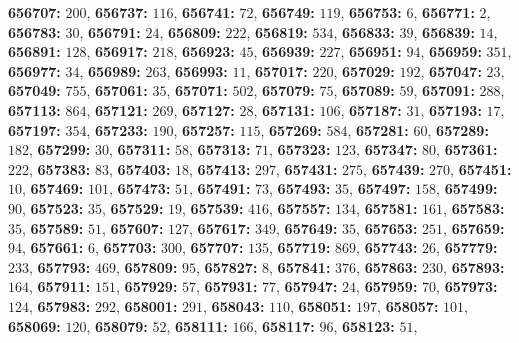 \textsf{\bfseries 656707:} $200$, \textsf{\bfseries 656737:} $116$, \textsf{\bfseries 656741:} $72$, \textsf{\bfseries 656749:} $119$, \textsf{\bfseries 656753:} $6$, \textsf{\bfseries 656771:} $2$, \textsf{\bfseries 656783:} $30$, \textsf{\bfseries 656791:} $24$, \textsf{\bfseries 656809:} $222$, \textsf{\bfseries 656819:} $534$, \textsf{\bfseries 656833:} $39$, \textsf{\bfseries 656839:} $14$, \textsf{\bfseries 656891:} $128$, \textsf{\bfseries 656917:} $218$, \textsf{\bfseries 656923:} $45$, \textsf{\bfseries 656939:} $227$, \textsf{\bfseries 656951:} $94$, \textsf{\bfseries 656959:} $351$, \textsf{\bfseries 656977:} $34$, \textsf{\bfseries 656989:} $263$, \textsf{\bfseries 656993:} $11$, \textsf{\bfseries 657017:} $220$, \textsf{\bfseries 657029:} $192$, \textsf{\bfseries 657047:} $23$, \textsf{\bfseries 657049:} $755$, \textsf{\bfseries 657061:} $35$, \textsf{\bfseries 657071:} $502$, \textsf{\bfseries 657079:} $75$, \textsf{\bfseries 657089:} $59$, \textsf{\bfseries 657091:} $288$, \textsf{\bfseries 657113:} $864$, \textsf{\bfseries 657121:} $269$, \textsf{\bfseries 657127:} $28$, \textsf{\bfseries 657131:} $106$, \textsf{\bfseries 657187:} $31$, \textsf{\bfseries 657193:} $17$, \textsf{\bfseries 657197:} $354$, \textsf{\bfseries 657233:} $190$, \textsf{\bfseries 657257:} $115$, \textsf{\bfseries 657269:} $584$, \textsf{\bfseries 657281:} $60$, \textsf{\bfseries 657289:} $182$, \textsf{\bfseries 657299:} $30$, \textsf{\bfseries 657311:} $58$, \textsf{\bfseries 657313:} $71$, \textsf{\bfseries 657323:} $123$, \textsf{\bfseries 657347:} $80$, \textsf{\bfseries 657361:} $222$, \textsf{\bfseries 657383:} $83$, \textsf{\bfseries 657403:} $18$, \textsf{\bfseries 657413:} $297$, \textsf{\bfseries 657431:} $275$, \textsf{\bfseries 657439:} $270$, \textsf{\bfseries 657451:} $10$, \textsf{\bfseries 657469:} $101$, \textsf{\bfseries 657473:} $51$, \textsf{\bfseries 657491:} $73$, \textsf{\bfseries 657493:} $35$, \textsf{\bfseries 657497:} $158$, \textsf{\bfseries 657499:} $90$, \textsf{\bfseries 657523:} $35$, \textsf{\bfseries 657529:} $19$, \textsf{\bfseries 657539:} $416$, \textsf{\bfseries 657557:} $134$, \textsf{\bfseries 657581:} $161$, \textsf{\bfseries 657583:} $35$, \textsf{\bfseries 657589:} $51$, \textsf{\bfseries 657607:} $127$, \textsf{\bfseries 657617:} $349$, \textsf{\bfseries 657649:} $35$, \textsf{\bfseries 657653:} $251$, \textsf{\bfseries 657659:} $94$, \textsf{\bfseries 657661:} $6$, \textsf{\bfseries 657703:} $300$, \textsf{\bfseries 657707:} $135$, \textsf{\bfseries 657719:} $869$, \textsf{\bfseries 657743:} $26$, \textsf{\bfseries 657779:} $233$, \textsf{\bfseries 657793:} $469$, \textsf{\bfseries 657809:} $95$, \textsf{\bfseries 657827:} $8$, \textsf{\bfseries 657841:} $376$, \textsf{\bfseries 657863:} $230$, \textsf{\bfseries 657893:} $164$, \textsf{\bfseries 657911:} $151$, \textsf{\bfseries 657929:} $57$, \textsf{\bfseries 657931:} $77$, \textsf{\bfseries 657947:} $24$, \textsf{\bfseries 657959:} $70$, \textsf{\bfseries 657973:} $124$, \textsf{\bfseries 657983:} $292$, \textsf{\bfseries 658001:} $291$, \textsf{\bfseries 658043:} $110$, \textsf{\bfseries 658051:} $197$, \textsf{\bfseries 658057:} $101$, \textsf{\bfseries 658069:} $120$, \textsf{\bfseries 658079:} $52$, \textsf{\bfseries 658111:} $166$, \textsf{\bfseries 658117:} $96$, \textsf{\bfseries 658123:} $51$, 
